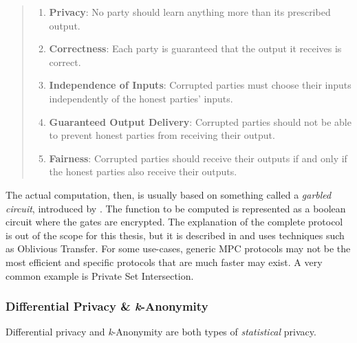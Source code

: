\begin{quote}{\citet[p.2]{secure-mpc}}
\begin{enumerate}
    \item \textbf{Privacy}: No party should learn anything more than its prescribed output.
    \item \textbf{Correctness}: Each party is guaranteed that the output it receives is correct.
    \item \textbf{Independence of Inputs}: Corrupted parties must choose their inputs independently of the honest parties' inputs.
    \item \textbf{Guaranteed Output Delivery}: Corrupted parties should not be able to prevent honest parties from receiving their output.
    \item \textbf{Fairness}: Corrupted parties should receive their outputs if and only if the honest parties also receive their outputs.
\end{enumerate}
\end{quote}
The actual computation, then, is usually based on something called a \textit{garbled circuit}, introduced by \citeauthor{yao}. The function to be computed is represented as a boolean circuit where the gates are encrypted. The explanation of the complete protocol is out of the scope for this thesis, but it is described in \citet{secure-mpc, pragmatic-mpc} and uses techniques such as Oblivious Transfer. For some use-cases, generic \gls{MPC} protocols may not be the most efficient and specific protocols that are much faster may exist. A very common example is Private Set Intersection.

\subsubsection{Differential Privacy \& \textit{k}-Anonymity}
Differential privacy and \textit{k}-Anonymity are both types of \textit{statistical} privacy. 

